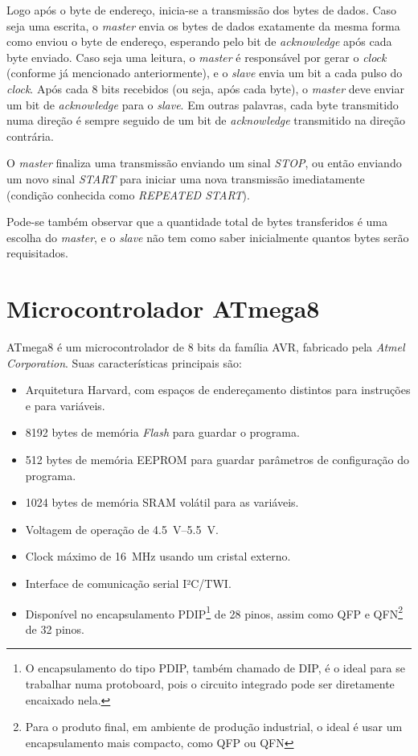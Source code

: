 \documentclass[brazil,pagestart=firstchapter]{abnt}
\begin{document}
Logo após o byte de endereço, inicia-se a transmissão dos bytes de dados.
Caso seja uma escrita, o \textit{master} envia os bytes de dados exatamente
da mesma forma como enviou o byte de endereço, esperando pelo bit de
\textit{acknowledge} após cada byte enviado. Caso seja uma leitura, o
\textit{master} é responsável por gerar o \textit{clock} (conforme já
mencionado anteriormente), e o \textit{slave} envia um bit a cada pulso do
\textit{clock}. Após cada 8 bits recebidos (ou seja, após cada byte), o
\textit{master} deve enviar um bit de \textit{acknowledge} para o
\textit{slave}. Em outras palavras, cada byte transmitido numa direção é
sempre seguido de um bit de \textit{acknowledge} transmitido na direção
contrária. \cite[p.~3]{AVR315}

O \textit{master} finaliza uma transmissão enviando um sinal \textit{STOP},
ou então enviando um novo sinal \textit{START} para iniciar uma nova
transmissão imediatamente (condição conhecida como \textit{REPEATED START}).
\cite[p.~158]{ATmega8}

Pode-se também observar que a quantidade total de bytes transferidos é uma
escolha do \textit{master}, e o \textit{slave} não tem como saber
inicialmente quantos bytes serão requisitados.


\section{Microcontrolador ATmega8}
\label{sec:atmega8}

ATmega8 é um microcontrolador de 8 bits da família AVR, fabricado pela
\textit{Atmel Corporation}. Suas características principais são:
\cite{ATmega8}

\begin{itemize}
\item Arquitetura Harvard, com espaços de endereçamento distintos para
instruções e para variáveis.
\item \num{8192} bytes de memória \textit{Flash} para guardar o programa.
\item \num{512} bytes de memória \ac{EEPROM} para guardar parâmetros de
configuração do programa.
\item \num{1024} bytes de memória \ac{SRAM} volátil para as variáveis.
\item Voltagem de operação de \SIrange{4.5}{5.5}{\volt}.
\item Clock máximo de \SI{16}{\mega\hertz} usando um cristal externo.
\item Interface de comunicação serial I²C/TWI.
\item Disponível no encapsulamento PDIP\footnote{
	O encapsulamento do tipo \ac{PDIP}, também chamado de \ac{DIP}, é o
	ideal para se trabalhar numa protoboard, pois o circuito integrado pode
	ser diretamente encaixado nela.}
de 28 pinos, assim como QFP e QFN\footnote{
	Para o produto final, em ambiente de produção industrial, o ideal é usar
	um encapsulamento mais compacto, como \ac{QFP} ou \ac{QFN}}
de 32 pinos.
\end{itemize}
\end{document}
